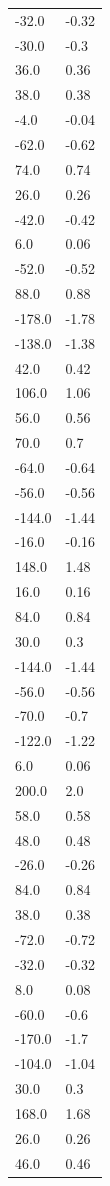 \begin{longtable}{ll}
-32.0 & -0.32 \\
-30.0 & -0.3 \\
36.0 & 0.36 \\
38.0 & 0.38 \\
-4.0 & -0.04 \\
-62.0 & -0.62 \\
74.0 & 0.74 \\
26.0 & 0.26 \\
-42.0 & -0.42 \\
6.0 & 0.06 \\
-52.0 & -0.52 \\
88.0 & 0.88 \\
-178.0 & -1.78 \\
-138.0 & -1.38 \\
42.0 & 0.42 \\
106.0 & 1.06 \\
56.0 & 0.56 \\
70.0 & 0.7 \\
-64.0 & -0.64 \\
-56.0 & -0.56 \\
-144.0 & -1.44 \\
-16.0 & -0.16 \\
148.0 & 1.48 \\
16.0 & 0.16 \\
84.0 & 0.84 \\
30.0 & 0.3 \\
-144.0 & -1.44 \\
-56.0 & -0.56 \\
-70.0 & -0.7 \\
-122.0 & -1.22 \\
6.0 & 0.06 \\
200.0 & 2.0 \\
58.0 & 0.58 \\
48.0 & 0.48 \\
-26.0 & -0.26 \\
84.0 & 0.84 \\
38.0 & 0.38 \\
-72.0 & -0.72 \\
-32.0 & -0.32 \\
8.0 & 0.08 \\
-60.0 & -0.6 \\
-170.0 & -1.7 \\
-104.0 & -1.04 \\
30.0 & 0.3 \\
168.0 & 1.68 \\
26.0 & 0.26 \\
46.0 & 0.46 \\

\end{longtable}
